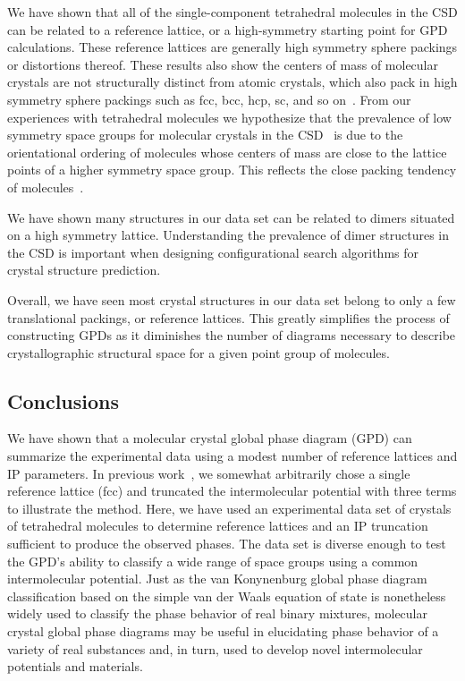 \documentclass[preprint]{iucr}              %
\begin{document}
We have shown that all of the single-component tetrahedral molecules
in the CSD can be related to a reference lattice, or a high-symmetry
starting point for GPD calculations.  These reference lattices are
generally high symmetry sphere packings or distortions thereof.
These results also show the centers of mass of molecular crystals
are not structurally distinct from atomic crystals, which also pack
in high symmetry sphere packings such as fcc, bcc, hcp, sc, and so
on~\cite{Mighell80}. From our experiences with tetrahedral molecules
we hypothesize that the prevalence of low symmetry space groups for
molecular crystals in the CSD~\cite{Allen02} is due to the
orientational ordering of molecules whose centers of mass are close
to the lattice points of a higher symmetry space group. This
reflects the close packing tendency of
molecules~\cite{Kitaigorodskii61}.

We have shown many structures in our data set can be related to
dimers situated on a high symmetry lattice. Understanding the
prevalence of dimer structures in the CSD is important when
designing configurational search algorithms for crystal structure
prediction.

Overall, we have seen most crystal structures in our data set belong
to only a few translational packings, or reference lattices.  This
greatly simplifies the process of constructing GPDs as it diminishes
the number of diagrams necessary to describe crystallographic
structural space for a given point group of molecules.



\subsection{Conclusions}

We have shown that a molecular crystal global phase diagram (GPD)
can summarize the experimental data using a modest number of
reference lattices and IP parameters. In previous
work~\cite{Keith04c,Mettes04}, we somewhat arbitrarily chose a
single reference lattice (fcc) and truncated the intermolecular
potential with three terms to illustrate the method. Here, we have
used an experimental data set of crystals of tetrahedral molecules
to determine reference lattices and an IP truncation sufficient to
produce the observed phases. The data set is diverse enough to test
the GPD's ability to classify a wide range of space groups using a
common intermolecular potential. Just as the van Konynenburg global
phase diagram classification based on the simple van der Waals
equation of state is nonetheless widely used to classify the phase
behavior of real binary mixtures, molecular crystal global phase
diagrams may be useful in elucidating phase behavior of a variety of
real substances and, in turn, used to develop novel intermolecular
potentials and materials.
\end{document}
